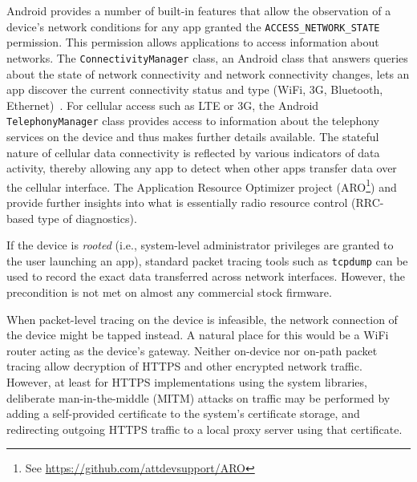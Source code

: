 Android provides a number of built-in features that allow the observation 
of a device's network conditions for any app granted the 
\texttt{ACCESS\_NETWORK\_STATE} permission. This permission 
allows applications to access information about networks.
The \texttt{ConnectivityManager} class, an Android class that 
answers queries about the state of network connectivity and 
network connectivity changes, lets an app discover the 
current connectivity status and type (WiFi, 3G, Bluetooth, Ethernet)~\cite{che2011case}. 
For cellular access such as LTE or 3G, the Android \texttt{TelephonyManager} 
class provides access to information about the telephony services on the 
device and thus makes further details available. The stateful nature of cellular 
data connectivity is reflected by various indicators of data activity, 
thereby allowing any app to detect when other apps transfer data over 
the cellular interface.  The Application Resource Optimizer project
(ARO\footnote{See \url{https://github.com/attdevsupport/ARO}}) and \cite{Ricciato2010551} 
provide further insights into what is 
essentially radio resource control (RRC-based type of diagnostics).


If the device is \textit{rooted} (i.e., system-level administrator 
privileges are granted to the user launching an app), standard 
packet tracing tools such as \texttt{tcpdump} can be used to 
record the exact data transferred across network interfaces. 
However, the precondition is not met on almost any commercial stock 
firmware.

When packet-level tracing on the device is infeasible, the network 
connection of the device might be tapped instead. A natural place 
for this would be a WiFi router acting as the device's gateway. 
Neither on-device nor on-path packet tracing allow decryption of 
HTTPS and other encrypted network traffic. However, at least for 
HTTPS implementations using the system libraries, deliberate 
man-in-the-middle (MITM) attacks on traffic may be performed 
by adding a self-provided certificate to the system's certificate 
storage, and redirecting outgoing HTTPS traffic to a local proxy 
server using that certificate.
